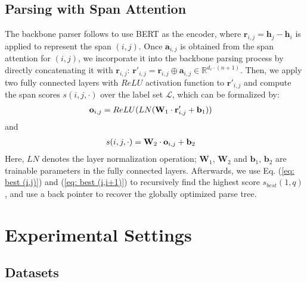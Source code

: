 \documentclass[11pt,a4paper]{article}
\begin{document}
\subsection{Parsing with Span Attention}


The backbone parser follows \citet{kitaev-etal-2019-multilingual} to use BERT as the encoder, where $\mathbf{r}_{i,j}=\mathbf{h}_{j}-\mathbf{h}_{i}$ is applied to represent the span $(i,j)$.
Once $\mathbf{a}_{i,j}$ is obtained from the span attention for $(i,j)$, we incorporate it into the backbone parsing process by directly concatenating it with $\mathbf{r}_{i,j}$:
$\mathbf{r}'_{i,j}=\mathbf{r}_{i,j} \oplus \mathbf{a}_{i,j} \in \mathbb{R}^{d_{r} \cdot (n+1)}$.
Then, we apply two fully connected layers with $ReLU$ activation function to $\mathbf{r}'_{i,j}$ and compute the span scores $s(i,j,\cdot)$ over the label set $\mathcal{L}$, which can be formalized by:
\begin{align} \label{eq: o_ij}
\setlength\abovedisplayskip{5pt}
\setlength\belowdisplayskip{5pt}
        \mathbf{o}_{i,j} &= ReLU(LN(\mathbf{W}_{1} \cdot \mathbf{r}'_{i,j} + \mathbf{b}_{1}))
\end{align}
and
\begin{align}
\setlength\abovedisplayskip{5pt}
\setlength\belowdisplayskip{5pt}
    s(i,j, \cdot) &= \mathbf{W}_{2} \cdot \mathbf{o}_{i,j} + \mathbf{b}_{2}
\end{align}
Here, $LN$ denotes the layer normalization operation;
$\mathbf{W}_{1}$, $\mathbf{W}_{2}$ and $\mathbf{b}_{1}$, $\mathbf{b}_{2}$ are trainable parameters in the fully connected layers.
Afterwards, we use Eq. (\ref{eq: best (i,j)}) and (\ref{eq: best (i,i+1)}) to recursively find the highest score $s_{best}(1,q)$, and use a back pointer to recover the globally optimized parse tree.



\section{Experimental Settings}


\subsection{Datasets}
\end{document}

